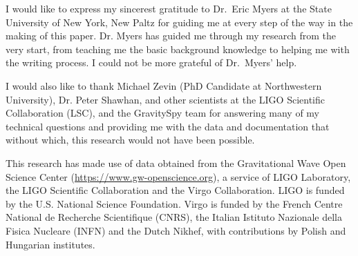 \documentclass[preprint,
letterpaper,
 amsmath,amssymb,
 aps,
]{revtex4-2}
\begin{document}
\begin{acknowledgments}
I would like to express my sincerest gratitude to Dr.\ Eric Myers at the State University of New York, New Paltz for guiding me at every step of the way in the making of this paper. Dr. Myers has guided me through my research from the very start, from teaching me the basic background knowledge to helping me with the writing process. I could not be more grateful of Dr.\ Myers' help.

I would also like to thank Michael Zevin (PhD Candidate at Northwestern University), Dr. Peter Shawhan, and other scientists at the LIGO Scientific Collaboration (LSC), and the GravitySpy team for answering many of my technical questions and providing me with the data and documentation that without which, this research would not have been possible. 

This research has made use of data obtained from the Gravitational Wave Open Science Center (\url{https://www.gw-openscience.org}), a service of LIGO Laboratory, the LIGO Scientific Collaboration and the Virgo Collaboration. LIGO is funded by the U.S. National Science Foundation. Virgo is funded by the French Centre National de Recherche Scientifique (CNRS), the Italian Istituto Nazionale della Fisica Nucleare (INFN) and the Dutch Nikhef, with contributions by Polish and Hungarian institutes.
\end{acknowledgments}



\end{document}
